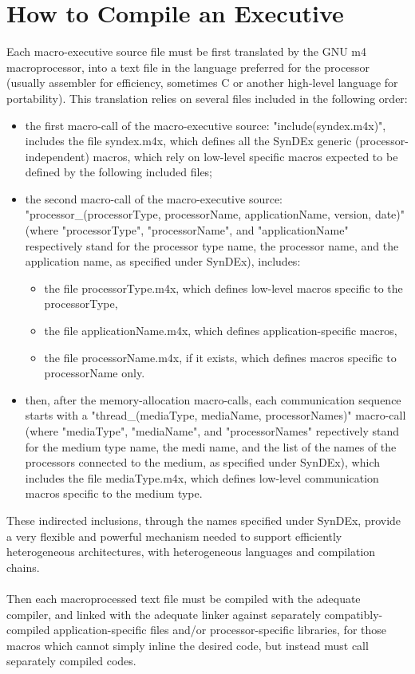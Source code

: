 \documentclass[11pt,twoside]{report}
\begin{document}
\section{How to Compile an Executive}
Each macro-executive source file must be first translated by the GNU
m4 macroprocessor, into a text file in the language preferred for the
processor (usually assembler for efficiency, sometimes C or another
high-level language for portability). This translation relies on
several files included in the following order:
\begin{itemize}
\item the first macro-call of the macro-executive source:
  "include(syndex.m4x)", includes the file syndex.m4x, which defines
  all the SynDEx generic (processor-independent) macros, which rely on
  low-level specific macros expected to be defined by the following
  included files;
\item the second macro-call of the macro-executive source:
  "processor\_(processorType, processorName, applicationName, version,
  date)" (where "processorType", "processorName", and
  "applicationName" respectively stand for the processor type name,
  the processor name, and the application name, as specified under
  SynDEx), includes:
\begin{itemize}
\item the file processorType.m4x, which defines low-level macros
  specific to the processorType,
\item the file applicationName.m4x, which defines application-specific macros,
\item the file processorName.m4x, if it exists, which defines macros specific to processorName only.
\end{itemize}
\item then, after the memory-allocation macro-calls, each
  communication sequence starts with a "thread\_(mediaType, mediaName,
  processorNames)" macro-call (where "mediaType", "mediaName", and
  "processorNames" repectively stand for the medium type name, the medi
  name, and the list of the names of the processors connected to the
  medium, as specified under SynDEx), which includes the file
  mediaType.m4x, which defines low-level communication macros specific
  to the medium type.
\end{itemize}
These indirected inclusions, through the names specified under SynDEx,
provide a very flexible and powerful mechanism needed to support
efficiently heterogeneous architectures, with heterogeneous languages
and compilation chains.\\\\
Then each macroprocessed text file must be compiled with the adequate
compiler, and linked with the adequate linker against separately
compatibly-compiled application-specific files and/or
processor-specific libraries, for those macros which cannot simply
inline the desired code, but instead must call separately compiled
codes.
\end{document}

